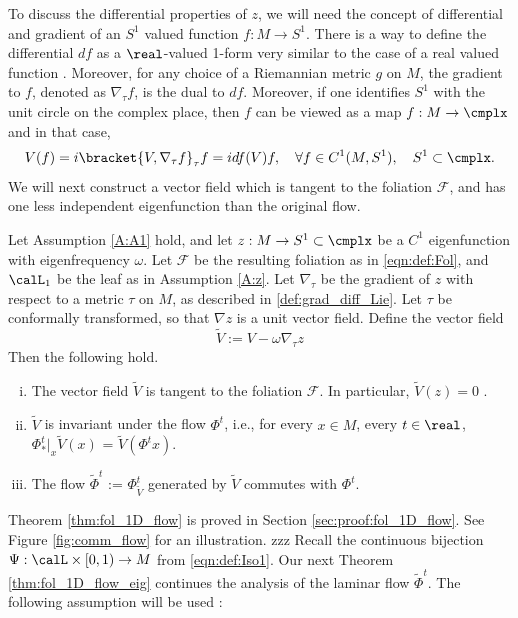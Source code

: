 \documentclass[12pt,oneside]{article}
\newcommand{\Fol}{\mathcal{F}}
\newcommand{\Iso}{\Psi}
\newcommand{\metric}{\tau}
\begin{document}
To discuss the differential properties of $z$, we will need the concept of differential and gradient of an $S^1$ valued function $f:M\to S^1$. There is a way to define the differential $df$ as a $\real$-valued 1-form very similar to the case of a real valued function  \citep[see][]{Das2023Lie}. Moreover, for any choice of a Riemannian metric $g$ on $M$, the gradient to $f$, denoted as $\nabla_{\metric} f$, is the dual to $df$. Moreover, if one identifies $S^1$ with the unit circle on the complex place, then $f$ can be viewed as a map $f:M\to \cmplx$ and in that case,
%
\begin{equation}\label{def:grad_diff_Lie}
V(f) = i \bracket{V, \nabla_{\metric} f}_{\metric}  f = i df(V) f, \quad \forall  f\in C^1(M,S^1), \quad S^1 \subset \cmplx.
\end{equation}
%
We will next construct a vector field which is tangent to the foliation $\Fol$, and has one less independent eigenfunction than the original flow. 
%
\begin{theorem}\label{thm:fol_1D_flow}
Let Assumption \ref{A:A1} hold, and let $z:M\to S^1 \subset \cmplx$ be a $C^1$ eigenfunction with eigenfrequency $\omega$. Let $\Fol$ be the resulting foliation as in \eqref{eqn:def:Fol}, and $\calL_1$ be the leaf as in Assumption \ref{A:z}. Let $\nabla_\metric$ be the gradient of $z$ with respect to a metric $\metric$ on $M$, as described in \eqref{def:grad_diff_Lie}. Let $\tau$ be conformally transformed, so that $\nabla z$ is a unit vector field.  Define the vector field
%
\begin{equation}\label{def:tildeV}
\tilde{V} := V - \omega \nabla_{\metric} z
\end{equation}
%
Then the following hold. 
\begin{enumerate}[(i)]
    \item The vector field $\tilde{V}$ is tangent to the foliation $\Fol$. In particular, $\tilde{V}(z) = 0$ .
    \item $\tilde{V}$ is invariant under the flow $\Phi^t$, i.e., for every $x\in M$, every $t\in\real$, $\Phi^{t}_*|_x \tilde{V}(x)$ = $\tilde{V}\left( \Phi^{t} x \right)$. 
    \item The flow $\tilde{\Phi}^t$ := $\Phi^t_{\tilde{V}}$ generated by $\tilde{V}$ commutes with $\Phi^t$.
\end{enumerate}
\end{theorem}

Theorem \ref{thm:fol_1D_flow} is proved in Section \ref{sec:proof:fol_1D_flow}. See Figure \ref{fig:comm_flow} for an illustration. zzz Recall the continuous bijection $\Iso: \calL \times  [0,1)\to M$ from \eqref{eqn:def:Iso1}. Our next Theorem \ref{thm:fol_1D_flow_eig} continues the analysis of the laminar flow $\tilde{\Phi}^t$. The following assumption will be used :
\end{document}
